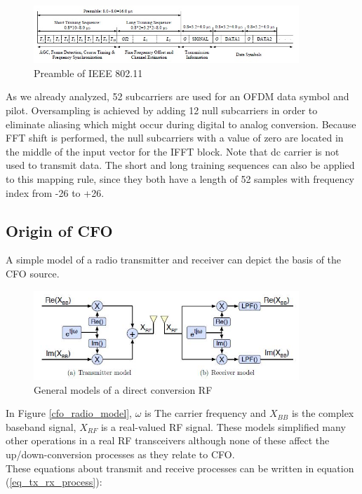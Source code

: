 \begin{figure}[h!]
\centering
\includegraphics[width=10cm]{content/fig/ofdm_frame.JPG}
\caption{Preamble of IEEE 802.11}
\label{fig:preamble_ieee}
\end{figure}


As we already analyzed, 52 subcarriers are used for an OFDM data symbol and pilot. Oversampling is achieved by adding 12 null subcarriers in order to eliminate aliasing which might occur during digital to analog conversion. Because FFT shift is performed, the null subcarriers with a value of zero are located in the middle of the input vector for the IFFT block. Note that dc carrier is not used to transmit data. The short and long training sequences can also be applied to this mapping rule, since they both have a length of 52 samples with frequency index from -26 to +26.\\


\subsection{Origin of CFO}
A simple model of a radio transmitter and receiver can depict the basis of the CFO source.

\begin{figure}[h!]
\centering
\includegraphics[width=10cm]{content/fig/cfo_radio_model.JPG}
\caption{General models of a direct conversion RF}
\label{fig:cfo_radio_model}
\end{figure}

In Figure \ref{cfo_radio_model}, $\omega$ is The carrier frequency and $X_{BB}$ is the complex baseband signal, $X_{RF}$ is
a real-valued RF signal. These models simplified many other operations in a real RF transceivers although none of these affect the up/down-conversion processes as they relate to CFO.\\
These equations about transmit and receive processes can be written in equation (\ref{eq_tx_rx_process}):

